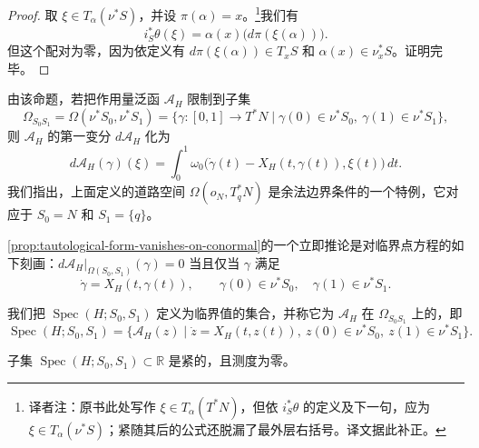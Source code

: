 \begin{proof}
取 $\xi\in T_\alpha(\nu^*S)$，并设 $\pi(\alpha)=x$。\footnote{译者注：原书此处写作 $\xi\in T_\alpha(T^*N)$，但依 $i_S^*\theta$ 的定义及下一句，应为 $\xi\in T_\alpha(\nu^*S)$；紧随其后的公式还脱漏了最外层右括号。译文据此补正。}我们有
\[
  i_S^*\theta(\xi)=\alpha(x)\bigl(d\pi(\xi(\alpha))\bigr).
\]
但这个配对为零，因为依定义有 $d\pi(\xi(\alpha))\in T_xS$ 和 $\alpha(x)\in\nu_x^*S$。证明完毕。
\end{proof}

由该命题，若把作用量泛函 $\mathcal A_H$ 限制到子集
\[
  \Omega_{S_0S_1}
  =\Omega(\nu^*S_0,\nu^*S_1)
  =\{\gamma:[0,1]\to T^*N
      \mid\gamma(0)\in\nu^*S_0,\ \gamma(1)\in\nu^*S_1\},
\]
则 $\mathcal A_H$ 的第一变分 $d\mathcal A_H$ 化为
\begin{equation}
  d\mathcal A_H(\gamma)(\xi)
  =\int_0^1\omega_0\bigl(\dot\gamma(t)-X_H(t,\gamma(t)),\xi(t)\bigr)\,dt.
  \label{eq:conormal-action-first-variation}
\end{equation}
我们指出，上面定义的道路空间 $\Omega(o_N,T_q^*N)$ 是余法边界条件的一个特例，它对应于 $S_0=N$ 和 $S_1=\{q\}$。

\cref{prop:tautological-form-vanishes-on-conormal}的一个立即推论是对临界点方程的如下刻画：$d\mathcal A_H|_{\Omega(S_0,S_1)}(\gamma)=0$ 当且仅当 $\gamma$ 满足
\begin{equation}
  \dot\gamma=X_H(t,\gamma(t)),
  \qquad
  \gamma(0)\in\nu^*S_0,\quad \gamma(1)\in\nu^*S_1.
  \label{eq:conormal-hamilton-equation}
\end{equation}

\begin{definition}[作用谱]
\label{def:conormal-action-spectrum}
我们把 $\operatorname{Spec}(H;S_0,S_1)$ 定义为临界值的集合，并称它为 $\mathcal A_H$ 在 $\Omega_{S_0S_1}$ 上的\termActionSpectrum{}，即
\[
  \operatorname{Spec}(H;S_0,S_1)
  =\{\mathcal A_H(z)\mid
      \dot z=X_H(t,z(t)),\ z(0)\in\nu^*S_0,\ z(1)\in\nu^*S_1\}.
\]
\end{definition}

\begin{proposition}
\label{prop:conormal-action-spectrum-measure-zero}
子集 $\operatorname{Spec}(H;S_0,S_1)\subset\mathbb R$ 是紧的，且测度为零。
\end{proposition}

